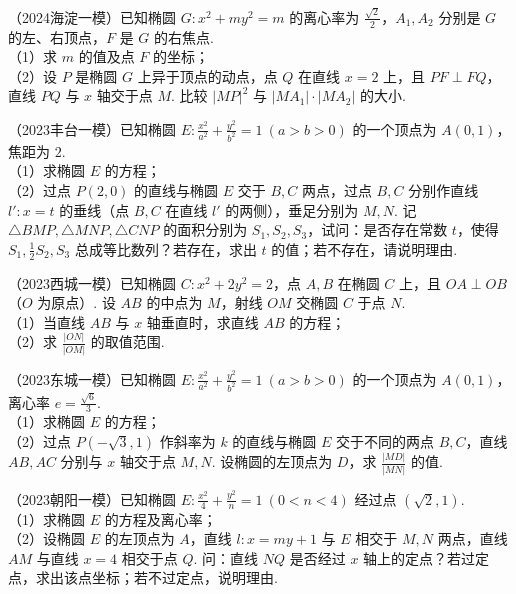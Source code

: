 \begin{example} %
（2024海淀一模）已知椭圆 $G:x^2+my^2=m$ 的离心率为 $\frac{\sqrt{2}}{2}$，$A_1,A_2$ 分别是 $G$ 的左、右顶点，$F$ 是 $G$ 的右焦点.\\
（1）求 $m$ 的值及点 $F$ 的坐标；\\
（2）设 $P$ 是椭圆 $G$ 上异于顶点的动点，点 $Q$ 在直线 $x=2$ 上，且 $PF\perp FQ$，直线 $PQ$ 与 $x$ 轴交于点 $M$. 比较 $\lvert MP\rvert^2$ 与 $\lvert MA_1\rvert\cdot\lvert MA_2\rvert$ 的大小.
\end{example}

\begin{example} %
（2023丰台一模）已知椭圆 $E:\frac{x^2}{a^2}+\frac{y^2}{b^2}=1\ (a>b>0)$ 的一个顶点为 $A(0,1)$，焦距为 $2$.\\
（1）求椭圆 $E$ 的方程；\\
（2）过点 $P(2,0)$ 的直线与椭圆 $E$ 交于 $B,C$ 两点，过点 $B,C$ 分别作直线 $l':x=t$ 的垂线（点 $B,C$ 在直线 $l'$ 的两侧），垂足分别为 $M,N$. 记 $\triangle BMP,\triangle MNP,\triangle CNP$ 的面积分别为 $S_1,S_2,S_3$，试问：是否存在常数 $t$，使得 $S_1,\frac{1}{2}S_2,S_3$ 总成等比数列？若存在，求出 $t$ 的值；若不存在，请说明理由.
\end{example}

\begin{example} %
（2023西城一模）已知椭圆 $C:x^2+2y^2=2$，点 $A,B$ 在椭圆 $C$ 上，且 $OA\perp OB$（$O$ 为原点）. 设 $AB$ 的中点为 $M$，射线 $OM$ 交椭圆 $C$ 于点 $N$.\\
（1）当直线 $AB$ 与 $x$ 轴垂直时，求直线 $AB$ 的方程；\\
（2）求 $\frac{\lvert ON\rvert}{\lvert OM\rvert}$ 的取值范围.
\end{example}

\begin{example} %
（2023东城一模）已知椭圆 $E:\frac{x^2}{a^2}+\frac{y^2}{b^2}=1\ (a>b>0)$ 的一个顶点为 $A(0,1)$，离心率 $e=\frac{\sqrt{6}}{3}$.\\
（1）求椭圆 $E$ 的方程；\\
（2）过点 $P(-\sqrt{3},1)$ 作斜率为 $k$ 的直线与椭圆 $E$ 交于不同的两点 $B,C$，直线 $AB,AC$ 分别与 $x$ 轴交于点 $M,N$. 设椭圆的左顶点为 $D$，求 $\frac{\lvert MD\rvert}{\lvert MN\rvert}$ 的值.
\end{example}

\begin{example} %
（2023朝阳一模）已知椭圆 $E:\frac{x^2}{4}+\frac{y^2}{n}=1\ (0<n<4)$ 经过点 $(\sqrt{2},1)$.\\
（1）求椭圆 $E$ 的方程及离心率；\\
（2）设椭圆 $E$ 的左顶点为 $A$，直线 $l:x=my+1$ 与 $E$ 相交于 $M,N$ 两点，直线 $AM$ 与直线 $x=4$ 相交于点 $Q$. 问：直线 $NQ$ 是否经过 $x$ 轴上的定点？若过定点，求出该点坐标；若不过定点，说明理由.
\end{example}

